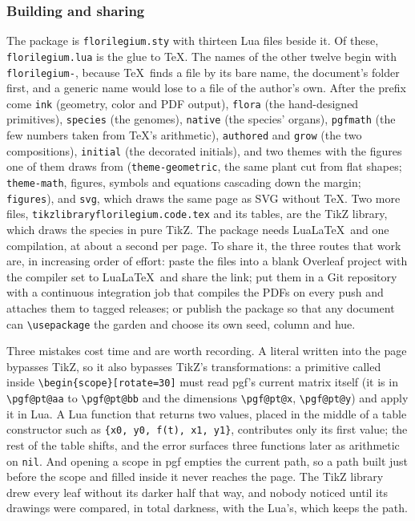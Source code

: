 \subsubsection{Building and sharing}

The package is \texttt{florilegium.sty} with thirteen Lua files beside it. Of these,
\texttt{florilegium.lua} is the glue to \TeX. The names of the other twelve begin with
\texttt{florilegium-}, because \TeX\ finds a file by its bare name, the document's folder
first, and a generic name would lose to a file of the author's own. After the prefix come
\texttt{ink} (geometry, color and PDF output), \texttt{flora} (the hand-designed primitives),
\texttt{species} (the genomes), \texttt{native} (the species' organs), \texttt{pgfmath} (the
few numbers taken from \TeX's arithmetic), \texttt{authored} and \texttt{grow} (the two
compositions), \texttt{initial} (the decorated initials), and two themes with the figures one
of them draws from (\texttt{theme-geometric}, the same plant cut from flat shapes;
\texttt{theme-math}, figures, symbols and equations cascading down the margin;
\texttt{figures}), and \texttt{svg}, which draws the same page as SVG without \TeX. Two more
files, \texttt{tikzlibraryflorilegium.code.tex} and its tables,
are the TikZ library, which draws the species in pure TikZ. The package needs Lua\LaTeX\ and
one compilation, at about a second per page. To share it, the three routes that work are, in
increasing order of effort: paste the files into a blank Overleaf project with the compiler set
to Lua\LaTeX\ and share the link; put them in a Git repository with a continuous integration
job that compiles the PDFs on every push and attaches them to tagged releases; or publish the
package so that any document can \texttt{\textbackslash usepackage} the garden and choose its
own seed, column and hue.

\begin{remark}
Three mistakes cost time and are worth recording. A literal written into the page bypasses
TikZ, so it also bypasses TikZ's transformations: a primitive called inside
\verb|\begin{scope}[rotate=30]| must read pgf's current matrix itself (it is in
\verb|\pgf@pt@aa| to \verb|\pgf@pt@bb| and the dimensions \verb|\pgf@pt@x|,
\verb|\pgf@pt@y|) and apply it in Lua. A Lua function that returns two values, placed
in the middle of a table constructor such as \verb|{x0, y0, f(t), x1, y1}|, contributes only
its first value; the rest of the table shifts, and the error surfaces three functions
later as arithmetic on \texttt{nil}. And opening a scope in pgf empties the current path, so a
path built just before the scope and filled inside it never reaches the page. The TikZ library
drew every leaf without its darker half that way, and nobody noticed until its drawings were
compared, in total darkness, with the Lua's, which keeps the path.
\end{remark}
